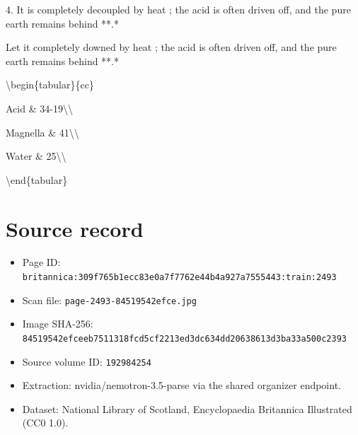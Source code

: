\documentclass{article}
\begin{document}
4. It is completely decoupled by heat ; the acid is often driven off, and the pure earth remains behind **.*

Let it completely downed by heat ; the acid is often driven off, and the pure earth remains behind **.*

\textbackslash{}begin\{tabular\}\{cc\}

Acid \& 34-19\textbackslash{}\textbackslash{}

Magnella \& 41\textbackslash{}\textbackslash{}

Water \& 25\textbackslash{}\textbackslash{}

\textbackslash{}end\{tabular\}

\section*{Source record}
\begin{itemize}
\item Page ID: \texttt{britannica:309f765b1ecc83e0a7f7762e44b4a927a7555443:train:2493}
\item Scan file: \texttt{page-2493-84519542efce.jpg}
\item Image SHA-256: \texttt{84519542efceeb7511318fcd5cf2213ed3dc634dd20638613d3ba33a500c2393}
\item Source volume ID: \texttt{192984254}
\item Extraction: nvidia/nemotron-3.5-parse via the shared organizer endpoint.
\item Dataset: National Library of Scotland, Encyclopaedia Britannica Illustrated (CC0 1.0).
\end{itemize}
\end{document}
